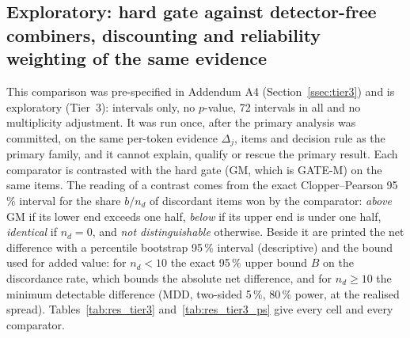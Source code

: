 \subsection{Exploratory: hard gate against detector-free combiners, discounting and reliability weighting of the same evidence}\label{ssec:res_expl}
This comparison was pre-specified in Addendum A4 (Section~\ref{ssec:tier3}) and is exploratory (Tier~3): intervals only, no $p$-value,
72 intervals in all and no multiplicity adjustment.
It was run once, after the primary analysis was committed, on the same per-token evidence $\Delta_j$, items and decision rule as the
primary family, and it cannot explain, qualify or rescue the primary result.
Each comparator is contrasted with the hard gate (GM, which is GATE-M) on the same items.
The reading of a contrast comes from the exact Clopper--Pearson 95\,\% interval for the share $b/n_d$ of discordant items won by the
comparator: \emph{above} GM if its lower end exceeds one half, \emph{below} if its upper end is under one half, \emph{identical} if
$n_d=0$, and \emph{not distinguishable} otherwise.
Beside it are printed the net difference with a percentile bootstrap 95\,\% interval (descriptive) and the bound used for added value:
for $n_d<10$ the exact 95\,\% upper bound $B$ on the discordance rate, which bounds the absolute net difference, and for $n_d\ge10$ the
minimum detectable difference (MDD, two-sided 5\,\%, 80\,\% power, at the realised spread).
Tables~\ref{tab:res_tier3} and~\ref{tab:res_tier3_ps} give every cell and every comparator.


